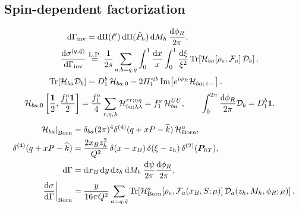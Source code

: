 \documentclass[a4paper,11pt]{article}
\begin{document}
\subsection{Spin-dependent factorization}

\begin{equation}
    \begin{aligned}
        \dd\Gamma_{\rm inv}
        &=\dd\Pi(\ell')\,\dd\Pi(\hat P_h)\,\dd M_h\,\frac{\dd\phi_R}{2\pi},\\
        \frac{\dd\sigma^{(q,\bar q)}}{\dd\Gamma_{\rm inv}}
        &\overset{\rm L.P.}{=}\frac{1}{2s}\sum_{a,b=q,\bar q}
            \int_0^1\frac{\dd x}{x}\int_0^1\frac{\dd\xi}{\xi^2}
          \operatorname{Tr}\!\left[{\cal H}_{ba}[\rho_e,{\cal F}_a]\,{\cal D}_b\right],\\
        \operatorname{Tr}\!\left[{\cal H}_{ba}{\cal D}_b\right]
        &=D_1^b\,{\cal H}_{ba,0}
           -2H_1^{\sphericalangle b}\operatorname{Im}
                              \!\left[e^{i\phi_R}{\cal H}_{ba;+-}\right].
    \end{aligned}
    \label{eq:sidis-invariant-factorization}
\end{equation}
\begin{equation}
    \begin{aligned}
        {\cal H}_{ba,0}\left[\frac{\mathbf 1}{2},\frac{f_1^a\mathbf 1}{2}\right]
        &=\frac{f_1^a}{4}\sum_{r,\eta,\lambda}{\cal H}_{ba;\lambda\lambda}^{rr;\eta\eta}
         =f_1^a\,{\cal H}_{ba}^{UU},\qquad
        \int_0^{2\pi}\frac{\dd\phi_R}{2\pi}{\cal D}_b=D_1^b\mathbf 1 .
    \end{aligned}
    \label{eq:sidis-spin-unpolarized-limit}
\end{equation}
\begin{equation}
    \begin{aligned}
        \left.{\cal H}_{ba}\right|_{\rm Born}
        &=\delta_{ba}(2\pi)^4\delta^{(4)}(q+xP-\widehat k)\,{\cal H}^{a}_{\rm Born},\\
        \delta^{(4)}(q+xP-\widehat k)
        &=\frac{2x_Bz_h^3}{Q^2}\,
            \delta(x-x_B)\,\delta(\xi-z_h)\,\delta^{(2)}(\bm P_{hT}),\\
        \dd\Gamma
        &=\dd x_B\,\dd y\,\dd z_h\,\dd M_h\,
                       \frac{\dd\psi}{2\pi}\frac{\dd\phi_R}{2\pi},\\
        \left.\frac{\dd\sigma}{\dd\Gamma}\right|_{\rm Born}
        &=\frac{y}{16\pi Q^2}\sum_{a=q,\bar q}
          \operatorname{Tr}\!\left[
              {\cal H}^a_{\rm Born}[\rho_e,{\cal F}_a(x_B,S;\mu)]\,
              {\cal D}_a(z_h,M_h,\phi_R;\mu)\right].
    \end{aligned}
    \label{eq:sidis-born-factorization}
\end{equation}
\end{document}
